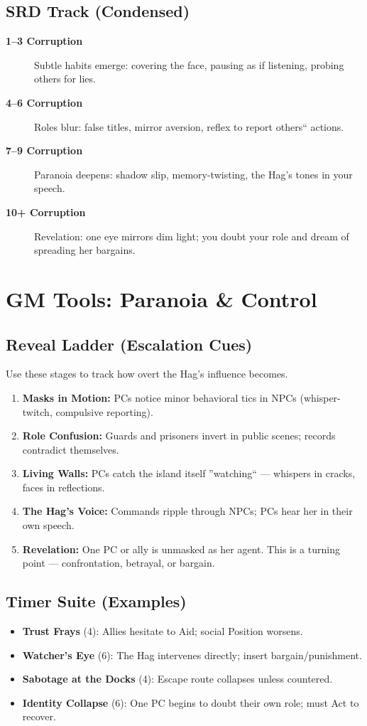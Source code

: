 \documentclass[11pt]{article}
\newcommand{\indexterm}[1]{\textbf{#1}}
\begin{document}
\subsection{SRD Track (Condensed)}
\begin{description}
  \item[\indexterm{1--3 Corruption}] Subtle habits emerge: covering the face, pausing as if listening, probing others for lies.
  \item[\indexterm{4--6 Corruption}] Roles blur: false titles, mirror aversion, reflex to report others`` actions.
  \item[\indexterm{7--9 Corruption}] Paranoia deepens: shadow slip, memory-twisting, the Hag's tones in your speech.
  \item[\indexterm{10+ Corruption}] Revelation: one eye mirrors dim light; you doubt your role and dream of spreading her bargains.
\end{description}

\section{GM Tools: Paranoia \& Control}

\subsection{Reveal Ladder (Escalation Cues)}
Use these stages to track how overt the Hag's influence becomes.
\begin{enumerate}
  \item \textbf{Masks in Motion:} PCs notice minor behavioral tics in NPCs (whisper-twitch, compulsive reporting).  
  \item \textbf{Role Confusion:} Guards and prisoners invert in public scenes; records contradict themselves.  
  \item \textbf{Living Walls:} PCs catch the island itself ''watching`` --- whispers in cracks, faces in reflections.  
  \item \textbf{The Hag's Voice:} Commands ripple through NPCs; PCs hear her in their own speech.  
  \item \textbf{Revelation:} One PC or ally is unmasked as her agent. This is a turning point --- confrontation, betrayal, or bargain.  
\end{enumerate}

\subsection{Timer Suite (Examples)}
\begin{itemize}
  \item \textbf{Trust Frays} (4): Allies hesitate to Aid; social Position worsens.  
  \item \textbf{Watcher's Eye} (6): The Hag intervenes directly; insert bargain/punishment.  
  \item \textbf{Sabotage at the Docks} (4): Escape route collapses unless countered.  
  \item \textbf{Identity Collapse} (6): One PC begins to doubt their own role; must Act to recover.  
\end{itemize}
\end{document}
